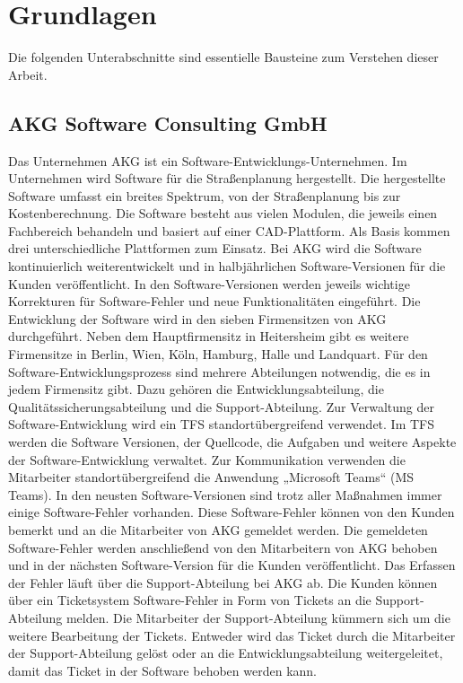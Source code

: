 \section{Grundlagen}
Die folgenden Unterabschnitte sind essentielle Bausteine zum Verstehen dieser Arbeit.

\subsection{AKG Software Consulting GmbH}
Das Unternehmen AKG ist ein Software-Entwicklungs-Unternehmen. Im Unternehmen wird Software für die Straßenplanung hergestellt. Die hergestellte Software umfasst ein breites Spektrum, von der Straßenplanung bis zur Kostenberechnung. Die Software besteht aus vielen Modulen, die jeweils einen Fachbereich behandeln und basiert auf
einer CAD-Plattform. Als Basis kommen drei unterschiedliche Plattformen zum Einsatz. Bei AKG wird die Software kontinuierlich weiterentwickelt und in halbjährlichen
Software-Versionen für die Kunden veröffentlicht. In den Software-Versionen werden jeweils wichtige Korrekturen für Software-Fehler und neue Funktionalitäten eingeführt. Die Entwicklung der Software wird in den sieben Firmensitzen von AKG durchgeführt. Neben dem Hauptfirmensitz in Heitersheim gibt es weitere Firmensitze in Berlin, Wien, Köln, Hamburg, Halle und Landquart. Für den Software-Entwicklungsprozess sind mehrere Abteilungen notwendig, die es in jedem Firmensitz gibt. Dazu gehören die Entwicklungsabteilung, die Qualitätssicherungsabteilung und die Support-Abteilung. Zur Verwaltung der Software-Entwicklung wird ein \ac{TFS} standortübergreifend verwendet. Im \ac{TFS} werden die Software Versionen, der Quellcode, die Aufgaben und weitere Aspekte der Software-Entwicklung verwaltet. Zur Kommunikation verwenden die Mitarbeiter standortübergreifend die Anwendung „Microsoft Teams“ (MS Teams). In den neusten Software-Versionen sind trotz aller Maßnahmen immer einige Software-Fehler vorhanden. Diese Software-Fehler können von den Kunden bemerkt und an die Mitarbeiter von AKG gemeldet werden. Die gemeldeten Software-Fehler werden anschließend von den Mitarbeitern von AKG behoben und in der nächsten Software-Version für die Kunden veröffentlicht. Das Erfassen der Fehler läuft über die Support-Abteilung bei AKG ab. Die Kunden können über ein Ticketsystem Software-Fehler in Form von Tickets an die Support-Abteilung melden. Die Mitarbeiter der Support-Abteilung kümmern sich um die weitere Bearbeitung der Tickets. Entweder wird das Ticket durch die Mitarbeiter der Support-Abteilung gelöst oder an die Entwicklungsabteilung weitergeleitet, damit das Ticket in der Software behoben werden kann.

